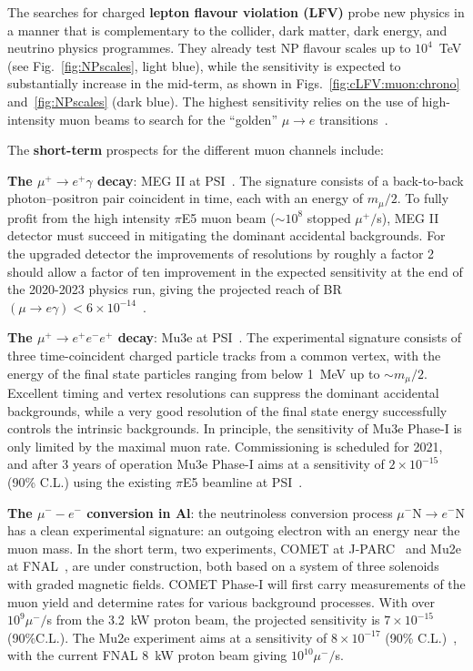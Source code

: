 The searches for charged \textbf{lepton flavour violation (LFV)}   probe new physics in a manner that is complementary
to the collider, dark
matter, dark energy, and neutrino physics programmes.
They already test NP flavour scales up to  $10^4$~TeV (see Fig.~\ref{fig:NPscales}, light blue), while the sensitivity is expected to substantially increase in the mid-term, 
as shown in Figs.~\ref{fig:cLFV:muon:chrono} 
and~\ref{fig:NPscales} (dark blue). 
The highest sensitivity relies on the use of high-intensity muon beams to search for the ``golden'' $\mu \to e$ transitions~\cite{Baldini:2018uhj}. 

The {\bf short-term} prospects for the different muon channels include:  

\textbf{The ${\mu^+ \to e^+ \gamma}$ decay}: MEG II at PSI~\cite{Baldini:2018nnn}. The signature consists of a back-to-back
photon--positron pair coincident in time,
each with an energy of $m_\mu/2$.
To fully profit from the high intensity $\pi$E5
muon beam ($\sim 10^8$ stopped $\mu^+/$s), 
MEG II detector must succeed in mitigating 
the dominant 
accidental backgrounds. 
For the upgraded detector the 
improvements of resolutions  by roughly a factor 2 should allow 
a factor of ten improvement in the expected sensitivity at the end of the 2020-2023 physics run, giving the projected reach of
BR$(\mu \to e \gamma)< 6 \times 10^{-14}$~\cite{Baldini:2018nnn}. 

\textbf{The ${\mu^+ \to e^+ e^- e^+}$ decay}: Mu3e at PSI~\cite{Blondel:2013ia}.  
The experimental signature 
consists of three time-coincident charged particle tracks from a common
vertex, with the energy of the final state particles 
ranging from below 1~MeV up to $\sim m_\mu/2$.
Excellent timing and vertex resolutions can suppress the dominant
accidental backgrounds, while a very good
resolution of the final state energy successfully controls the intrinsic backgrounds.
In principle,
the sensitivity of Mu3e Phase-I is only limited by the maximal muon rate.
Commissioning is scheduled for 2021, and 
after 3 years of operation
Mu3e Phase-I aims at a sensitivity of $2\times 10^{-15}$ (90\% C.L.)
using the existing $\pi$E5 beamline at PSI~\cite{Blondel:2013ia}.

\textbf{The ${\mu^- - e^-}$ conversion in Al}: 
the neutrinoless conversion process $\mu^- \text{N} \to e^- \text{N}$ has a clean
experimental signature: an outgoing electron with an
energy near the muon mass. 
In the short term, two experiments, COMET at 
J-PARC~\cite{Adamov:2018vin} and Mu2e at FNAL~\cite{Bartoszek:2014mya}, 
are under construction, both based on a system
of three solenoids with graded magnetic fields.
COMET Phase-I 
will first carry measurements of the muon yield and determine
rates for various background processes. 
With over $10^{9} \mu^-/$s from the 3.2~kW proton beam,
the projected sensitivity 
is $7 \times 10^{-15}$ (90\%C.L.). 
%
The Mu2e experiment aims at 
a sensitivity of $8 \times 10^{-17}$ (90\% C.L.)~\cite{Bartoszek:2014mya}, with the current
FNAL 8~kW proton beam giving $10^{10} \mu^-/$s. 

